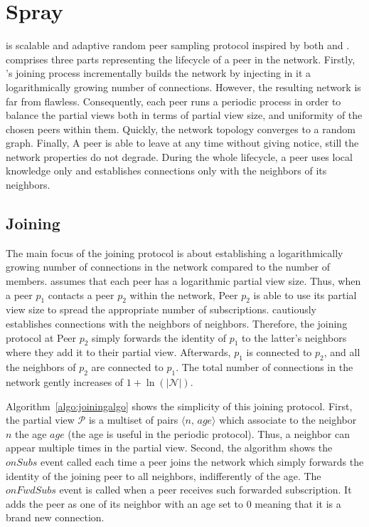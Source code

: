 
\section{Spray}
\label{sec:proposal}

\SCAMPLON{} \SCAMPLONDESCRIPTION{} is scalable and adaptive random
peer sampling protocol inspired by both \SCAMP{} and \CYCLON{}. \SCAMPLON{}
comprises three parts representing the lifecycle of a peer in the network.
Firstly, \SCAMPLON{}'s joining process incrementally builds the network by
injecting in it a logarithmically growing number of connections. However, the
resulting network is far from flawless. Consequently, each peer runs a periodic
process in order to balance the partial views both in terms of partial view
size, and uniformity of the chosen peers within them. Quickly, the network
topology converges to a random graph. Finally, A peer is able to leave at any
time without giving notice, still the network properties do not degrade. During
the whole lifecycle, a peer uses local knowledge only and establishes
connections only with the neighbors of its neighbors.

\subsection{Joining}

The main focus of the joining protocol is about establishing a logarithmically
growing number of connections in the network compared to the number of members.
\SCAMPLON{} assumes that each peer has a logarithmic partial view size. Thus,
when a peer $p_1$ contacts a peer $p_2$ within the network, Peer $p_2$ is able
to use its partial view size to spread the appropriate number of subscriptions.
\SCAMPLON{} cautiously establishes connections with the neighbors of
neighbors. Therefore, the joining protocol at Peer $p_2$ simply forwards the
identity of $p_1$ to the latter's neighbors where they add it to their partial
view. Afterwards, $p_1$ is connected to $p_2$, and all the neighbors of $p_2$
are connected to $p_1$. The total number of connections in the network gently
increases of $1+\ln(|\mathcal{N}|)$.

Algorithm~\ref{algo:joiningalgo} shows the simplicity of this joining
protocol. First, the partial view $\mathcal{P}$ is a multiset of pairs
$\langle n,\, age\rangle$ which associate to the neighbor $n$ the age $age$
(the age is useful in the periodic protocol). Thus, a neighbor can appear
multiple times in the partial view. Second, the algorithm shows the $onSubs$
event called each time a peer joins the network which simply forwards the
identity of the joining peer to all neighbors, indifferently of the age. The
$onFwdSubs$ event is called when a peer receives such forwarded
subscription. It adds the peer as one of its neighbor with an age set to $0$
meaning that it is a brand new connection.

